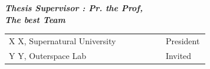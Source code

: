 \begin{titlepage}
\vspace*{0.5cm}
\begin{center}
\textbf{\large \emph{Thesis Supervisor : Pr. the Prof,\\
The best Team}}
\end{center}



\vfill %


\begin{center}
\end{center}


\begin{center}
\vspace*{0.2cm}
\noindent \Large
\begin{tabular}{p{0.75\linewidth}p{0.21\linewidth}}
X X, Supernatural University & President \\
Y Y, Outerspace Lab &  Invited
\end{tabular}
\end{center}

\end{titlepage} 